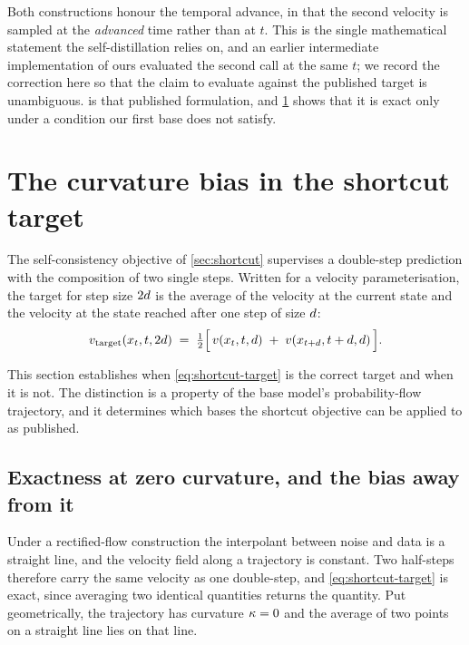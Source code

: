 Both constructions honour the temporal advance, in that the second velocity
is sampled at the \emph{advanced} time rather than at $t$. This is the
single mathematical statement the self-distillation relies on, and an
earlier intermediate implementation of ours evaluated the second call at the
same $t$; we record the correction here so that the claim to evaluate
against the published target is unambiguous.
 is that published formulation, and
\cref{sec:curvature} shows that it is exact only under a condition our first
base does not satisfy.

\section{The curvature bias in the shortcut target}
\label{sec:curvature}

The self-consistency objective of \cref{sec:shortcut} supervises a
double-step prediction with the composition of two single steps. Written for
a velocity parameterisation, the target for step size $2d$ is the
average of the velocity at the current state and the velocity at the state
reached after one step of size $d$:
\begin{equation}
  \label{eq:shortcut-target}
  v_{\text{target}}(x_t, t, 2d)
  \;=\; \tfrac{1}{2}\Big[\, v(x_t, t, d) \;+\; v(x_{t+d}, t+d, d) \,\Big].
\end{equation}

This section establishes when \cref{eq:shortcut-target} is the correct
target and when it is not. The distinction is a property of the base
model's probability-flow trajectory, and it determines which bases the
shortcut objective can be applied to as published.

\subsection{Exactness at zero curvature, and the bias away from it}

Under a rectified-flow construction the interpolant between noise and data
is a straight line, and the velocity field along a trajectory is constant.
Two half-steps therefore carry the same velocity as one double-step, and
\cref{eq:shortcut-target} is exact, since averaging two identical
quantities returns the quantity. Put geometrically, the trajectory has
curvature $\kappa = 0$ and the average of two points on a straight line lies
on that line.

